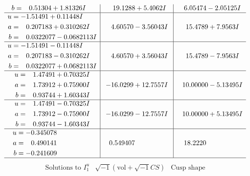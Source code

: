 \documentclass[1p]{elsarticle_modified}
\theoremstyle{definition}
\newcommand{\I}{\sqrt{-1}}
\begin{document}
$$\begin{array}{c|c|c}
\begin{aligned}
b &= \phantom{-}0.51304 + 1.81326 I\end{aligned}
 & \phantom{-}19.1288 + 5.4062 I & \phantom{-}6.05474 - 2.05125 I \\ \hline\begin{aligned}
u &= -1.51491 + 0.11448 I \\
a &= \phantom{-}0.207183 + 0.310262 I \\
b &= \phantom{-}0.0322077 - 0.0682113 I\end{aligned}
 & \phantom{-}4.60570 - 3.56043 I & \phantom{-}15.4789 + 7.9563 I \\ \hline\begin{aligned}
u &= -1.51491 - 0.11448 I \\
a &= \phantom{-}0.207183 - 0.310262 I \\
b &= \phantom{-}0.0322077 + 0.0682113 I\end{aligned}
 & \phantom{-}4.60570 + 3.56043 I & \phantom{-}15.4789 - 7.9563 I \\ \hline\begin{aligned}
u &= \phantom{-}1.47491 + 0.70325 I \\
a &= \phantom{-}1.73912 + 0.75900 I \\
b &= \phantom{-}0.93744 + 1.60343 I\end{aligned}
 & -16.0299 + 12.7557 I & \phantom{-}10.00000 - 5.13495 I \\ \hline\begin{aligned}
u &= \phantom{-}1.47491 - 0.70325 I \\
a &= \phantom{-}1.73912 - 0.75900 I \\
b &= \phantom{-}0.93744 - 1.60343 I\end{aligned}
 & -16.0299 - 12.7557 I & \phantom{-}10.00000 + 5.13495 I \\ \hline\begin{aligned}
u &= -0.345078\phantom{ +0.000000I} \\
a &= \phantom{-}0.490141\phantom{ +0.000000I} \\
b &= -0.241609\phantom{ +0.000000I}\end{aligned}
 & \phantom{-}0.549407\phantom{ +0.000000I} & \phantom{-}18.2220\phantom{ +0.000000I}\\
 \hline 
 \end{array}$$\newpage$$\begin{array}{c|c|c}  
\text{Solutions to }I^u_{1}& \I (\text{vol} + \sqrt{-1}CS) & \text{Cusp shape}\\
 \hline 
\begin{aligned}

\end{aligned}
\end{array}$$
\end{document}

